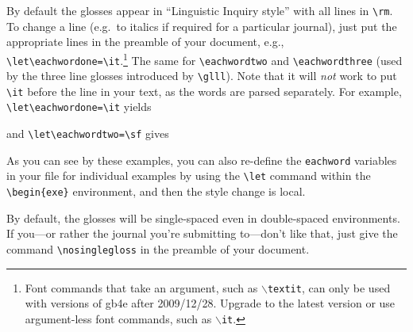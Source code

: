 \documentclass[11pt,a4paper]{article}
\def\bs{$\backslash$}
\begin{document}
By default the glosses appear in
``Linguistic Inquiry style'' with all lines in \verb"\rm". To change a line
(e.g.\ to italics if required for a particular journal), just put
the appropriate lines in the preamble of your document, e.g.,
\verb"\let\eachwordone=\it".\footnote{Font commands that take an argument, such as {\tt \bs textit}, can only be used with versions of gb4e after 2009/12/28. Upgrade to the latest version or use argument-less font commands, such as {\tt \bs it}.}
 The same for 
\verb"\eachwordtwo" and \verb"\eachwordthree" (used by the three line
glosses introduced by \verb'\glll'). Note that it will
{\em not} work  
to put \verb"\it" before the line in your text, as the words are parsed
separately.
 For example,
\verb"\let\eachwordone=\it" yields
\begin{exe}
\let\eachwordone=\it
{}
\end{exe}
and \verb"\let\eachwordtwo=\sf" gives 
\begin{exe}\let\eachwordtwo=\sf
{}
\end{exe}
As you can see by these examples, you can also re-define the {\tt eachword}
variables in your file for individual examples by using the \verb"\let"
command within the \verb"\begin{exe}" environment, and then the style change is
local.

By default, the glosses will be single-spaced even in double-spaced
environments. If you---or rather the journal you're submitting
to---don't like that, just give the command \verb,\nosinglegloss, in the
preamble of your document. 
\end{document}

